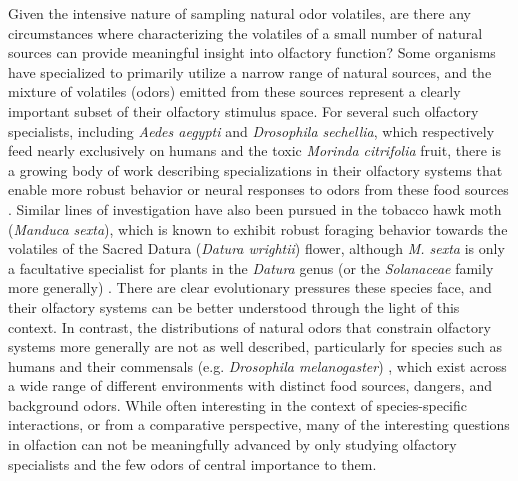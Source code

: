 \documentclass[12pt]{caltech_thesis}
\renewcommand{\cite}{{ }\autocite}
\begin{document}
\begin{refsection}
Given the intensive nature of sampling natural odor volatiles, are there any circumstances where characterizing the volatiles of a small number of natural sources can provide meaningful insight into olfactory function?
Some organisms have specialized to primarily utilize a narrow range of natural sources, and the mixture of volatiles (odors) emitted from these sources represent a clearly important subset of their olfactory stimulus space.
For several such olfactory specialists, including \textit{Aedes aegypti} and \textit{Drosophila sechellia}, which respectively feed nearly exclusively on humans and the toxic \textit{Morinda citrifolia} fruit, there is a growing body of work describing specializations in their olfactory systems that enable more robust behavior or neural responses to odors from these food sources\cite{MosquitoORNHumanOdorSynergy,Dekker2006,SechelliaStensmyrReview09,Auer2020,ComparativeDrosImaging,Takagi2024,Dürr2025}.
Similar lines of investigation have also been pursued in the tobacco hawk moth (\textit{Manduca sexta}), which is known to exhibit robust foraging behavior towards the volatiles of the Sacred Datura (\textit{Datura wrightii}) flower, although \textit{M. sexta} is only a facultative specialist for plants in the \textit{Datura} genus (or the \textit{Solanaceae} family more generally)\cite{Riffell2009,HawkmothHostHeadspaces}.
There are clear evolutionary pressures these species face, and their olfactory systems can be better understood through the light of this context.
In contrast, the distributions of natural odors that constrain olfactory systems more generally are not as well described, particularly for species such as humans and their commensals (e.g. \textit{Drosophila melanogaster})\cite{DrosophilaEcology}, which exist across a wide range of different environments with distinct food sources, dangers, and background odors.
While often interesting in the context of species-specific interactions, or from a comparative perspective, many of the interesting questions in olfaction can not be meaningfully advanced by only studying olfactory specialists and the few odors of central importance to them.


\end{refsection}
\end{document}
